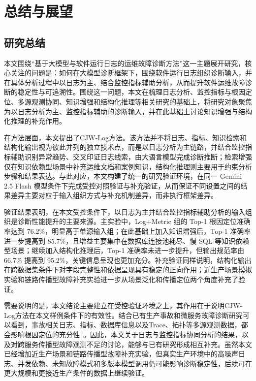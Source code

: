 \chapter{总结与展望}

\section{研究总结}

本文围绕“基于大模型与软件运行日志的运维故障诊断方法”这一主题展开研究，核心关注的问题是：如何在大模型诊断框架下，围绕软件运行日志组织诊断输入，并在具体分析过程中以日志为主、结合监控指标辅助分析，从而提升软件运维故障诊断的稳定性与可追溯性。围绕这一问题，本文在梳理日志分析、监控指标与根因定位、多源观测协同、知识增强和结构化推理等相关研究的基础上，将研究对象聚焦为以日志分析为主、监控指标辅助的诊断输入，并在此基础上讨论知识增强与结构化推理的补充作用。

在方法层面，本文提出了CJW-Log方法。该方法并不将日志、指标、知识检索和结构化输出视为彼此并列的独立技术点，而是以日志分析为主链路，并结合监控指标辅助识别异常趋势、交叉印证日志线索，由大语言模型完成诊断推断；检索增强仅在知识依赖型场景中补充运维文档和案例知识，结构化推理则主要用于约束分析步骤和结果表达。与此对应，本文构建了统一的研究验证环境，在同一 Gemini 2.5 Flash 模型条件下完成受控对照验证与补充验证，从而保证不同设置之间的结果差异主要对应于输入组织方式与补充机制差异，而非执行框架差异。

验证结果表明，在本文受控条件下，以日志为主并结合监控指标辅助分析的输入组织是诊断性能提升的主要来源。主实验中，Log+Metric 组的 Top-1 根因定位准确率达到 76.2\%，明显高于单源输入组；在此基础上加入知识增强后，Top-1 准确率进一步提高到 85.7\%，且增益主要集中在数据库连接池耗尽、慢 SQL 等知识依赖型场景；继续加入结构化推理后，Top-1 准确率未进一步提升，但输出规范率由 66.7\% 提高到 95.2\%，关键信息呈现也更加充分。补充验证同样说明，结构化输出在跨数据集条件下对字段完整性和依据呈现具有稳定的正向作用；近生产场景模拟实验和链路传播型故障补充实验进一步从场景泛化和传播定位两个角度补充了验证。

需要说明的是，本文结论主要建立在受控验证环境之上，其作用在于说明CJW-Log方法在本文样例条件下的有效性。结合已有生产事故和微服务故障诊断研究可以看到，事故相关日志、指标、数据库信息以及Trace、拓扑等多源观测数据，都会影响根因定位的充分性~\cite{roy2024agents,zhang2024fdsurvey}。因此，本文关于日志与监控指标协同分析的结果，以及对跨服务传播型故障观测不足的讨论，能够与已有研究形成相互补充。虽然本文已经增加近生产场景和链路传播型故障补充实验，但真实生产环境中的高噪声日志、并发依赖、未知故障模式和多版本模型调用仍可能影响诊断稳定性，后续可在更大规模和更接近生产条件的数据上继续验证。

